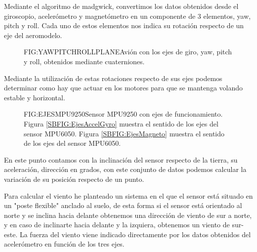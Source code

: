    Mediante el algoritmo de madgwick, convertimos los datos obtenidos desde el giroscopio, acelerómetro y magnetómetro en un componente de 3 elementos, yaw, pitch y roll.
   Cada uno de estos elementos nos indica su rotación respecto de un eje del aeromodelo. 
 

\begin{figure}{FIG:YAWPITCHROLLPLANE}{Avión con los ejes de giro, yaw, pitch y roll, obtenidos mediante cuaterniones.}
\end{figure}
 
 Mediante la utilización de estas rotaciones respecto de sus ejes podemos determinar como hay que actuar en los motores para que se mantenga volando estable y horizontal.
  

\begin{figure}[Ejes MPU9250]{FIG:EJESMPU9250}{Sensor MPU9250 con ejes de funcionamiento. Figura \ref{SBFIG:EjesAccelGyro} muestra el sentido de los ejes del sensor MPU6050. Figura \ref{SBFIG:EjesMagneto} muestra el sentido de los ejes del sensor MPU6050.}
   \quad
\end{figure} 

 
 En este punto contamos con la inclinación del sensor respecto de la tierra, su aceleración, dirección en grados, con este conjunto de datos podemos calcular la variación de su posición respecto de un punto.
 

  
  Para calcular el viento he planteado un sistema en el que el sensor está situado en un "poste flexible" anclado al suelo, de esta forma si el sensor está orientado al norte y se inclina hacia delante obtenemos una dirección de viento de sur a norte, y en caso de inclinarte hacia delante y la izquiera, obtenemos un viento de sur-este. La fuerza del viento viene indicado directamente por los datos obtenidos del acelerómetro en función de los tres ejes.
  
  